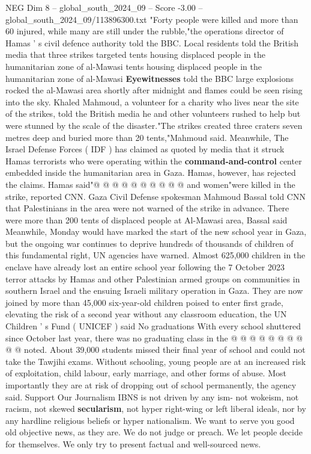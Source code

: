 \begin{textsample}{NEG Dim 8 – global\_south\_2024\_09 – Score -3.00 – global\_south\_2024\_09/113896300.txt}  \label{ex:f8_neg_201}
"Forty people were killed and more than 60 injured, while many are still under the rubble,"the operations director of Hamas ' s civil defence authority told the BBC.
Local residents told the British media that three strikes targeted tents housing displaced people in the humanitarian zone of al-Mawasi tents housing displaced people in the humanitarian zone of al-Mawasi \textbf{Eyewitnesses} told the BBC large explosions rocked the al-Mawasi area shortly after midnight and flames could be seen rising into the sky.
Khaled Mahmoud, a volunteer for a charity who lives near the site of the strikes, told the British media he and other volunteers rushed to help but were stunned by the scale of the disaster."The strikes created three craters seven metres deep and buried more than 20 tents,"Mahmoud said.
Meanwhile, The Israel Defense Forces ( IDF ) has claimed as quoted by media that it struck Hamas terrorists who were operating within the \textbf{command-and-control} center embedded inside the humanitarian area in Gaza.
Hamas, however, has rejected the claims.
Hamas said"@ @ @ @ @ @ @ @ @ @ and women"were killed in the strike, reported CNN.
Gaza Civil Defense spokesman Mahmoud Bassal told CNN that Palestinians in the area were not warned of the strike in advance.
There were more than 200 tents of displaced people at Al-Mawasi area, Bassal said Meanwhile, Monday would have marked the start of the new school year in Gaza, but the ongoing war continues to deprive hundreds of thousands of children of this fundamental right, UN agencies have warned.
Almost 625,000 children in the enclave have already lost an entire school year following the 7 October 2023 terror attacks by Hamas and other Palestinian armed groups on communities in southern Israel and the ensuing Israeli military operation in Gaza.
They are now joined by more than 45,000 six-year-old children poised to enter first grade, elevating the risk of a second year without any classroom education, the UN Children ' s Fund ( UNICEF ) said No graduations With every school shuttered since October last year, there was no graduating class in the @ @ @ @ @ @ @ @ @ @ noted.
About 39,000 students missed their final year of school and could not take the Tawjihi exams.
Without schooling, young people are at an increased risk of exploitation, child labour, early marriage, and other forms of abuse.
Most importantly they are at risk of dropping out of school permanently, the agency said.
Support Our Journalism IBNS is not driven by any ism- not wokeism, not racism, not skewed \textbf{secularism}, not hyper right-wing or left liberal ideals, nor by any hardline religious beliefs or hyper nationalism.
We want to serve you good old objective news, as they are.
We do not judge or preach.
We let people decide for themselves.
We only try to present factual and well-sourced news.

\end{textsample}
